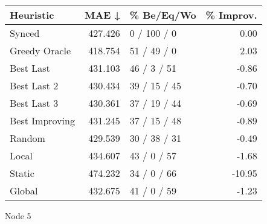 \begin{tabular}{lrlr}
\toprule
\textbf{Heuristic} & \textbf{MAE ↓} & \textbf{\% Be/Eq/Wo} & \textbf{\% Improv.} \\
\midrule
            Synced &        427.426 &          0 / 100 / 0 &                0.00 \\
     Greedy Oracle &        418.754 &          51 / 49 / 0 &                2.03 \\
         Best Last &        431.103 &          46 / 3 / 51 &               -0.86 \\
       Best Last 2 &        430.434 &         39 / 15 / 45 &               -0.70 \\
       Best Last 3 &        430.361 &         37 / 19 / 44 &               -0.69 \\
    Best Improving &        431.245 &         37 / 15 / 48 &               -0.89 \\
            Random &        429.539 &         30 / 38 / 31 &               -0.49 \\
             Local &        434.607 &          43 / 0 / 57 &               -1.68 \\
            Static &        474.232 &          34 / 0 / 66 &              -10.95 \\
            Global &        432.675 &          41 / 0 / 59 &               -1.23 \\
\bottomrule
\end{tabular}
\caption{Node 5}
\label{tab:iid_lr05_le2_bs2_5}
